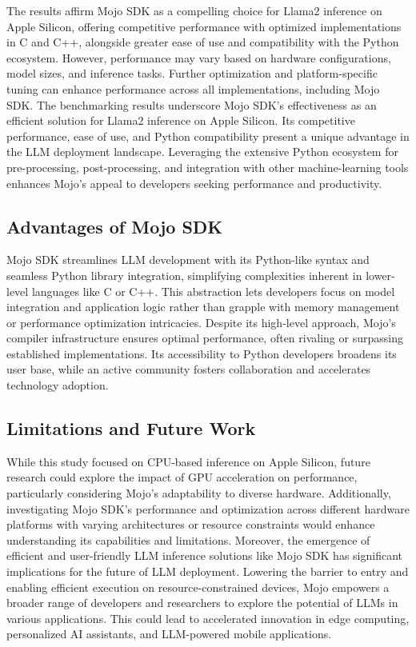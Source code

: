 \documentclass[sigconf]{acmart}
\begin{document}
The results affirm Mojo SDK as a compelling choice for Llama2 inference on Apple Silicon, offering competitive performance with optimized implementations in C and C++, alongside greater ease of use and compatibility with the Python ecosystem. However, performance may vary based on hardware configurations, model sizes, and inference tasks. Further optimization and platform-specific tuning can enhance performance across all implementations, including Mojo SDK.
The benchmarking results underscore Mojo SDK's effectiveness as an efficient solution for Llama2 inference on Apple Silicon. Its competitive performance, ease of use, and Python compatibility present a unique advantage in the LLM deployment landscape. Leveraging the extensive Python ecosystem for pre-processing, post-processing, and integration with other machine-learning tools enhances Mojo's appeal to developers seeking performance and productivity.


\subsection{Advantages of Mojo SDK}
Mojo SDK streamlines LLM development with its Python-like syntax and seamless Python library integration, simplifying complexities inherent in lower-level languages like C or C++. This abstraction lets developers focus on model integration and application logic rather than grapple with memory management or performance optimization intricacies. Despite its high-level approach, Mojo's compiler infrastructure ensures optimal performance, often rivaling or surpassing established implementations. Its accessibility to Python developers broadens its user base, while an active community fosters collaboration and accelerates technology adoption.


\subsection{Limitations and Future Work}
While this study focused on CPU-based inference on Apple Silicon, future research could explore the impact of GPU acceleration on performance, particularly considering Mojo's adaptability to diverse hardware. Additionally, investigating Mojo SDK's performance and optimization across different hardware platforms with varying architectures or resource constraints would enhance understanding its capabilities and limitations.
Moreover, the emergence of efficient and user-friendly LLM inference solutions like Mojo SDK has significant implications for the future of LLM deployment. Lowering the barrier to entry and enabling efficient execution on resource-constrained devices, Mojo empowers a broader range of developers and researchers to explore the potential of LLMs in various applications. This could lead to accelerated innovation in edge computing, personalized AI assistants, and LLM-powered mobile applications.
\end{document}
